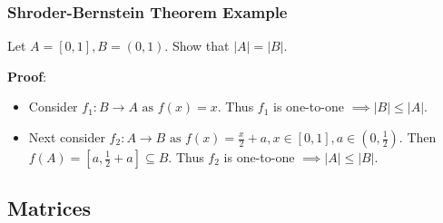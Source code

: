 \documentclass{article}
\begin{document}
\subsubsection{Shroder-Bernstein Theorem Example}

Let $ A = [0, 1], B = (0, 1) $. Show that $ |A| = |B| $.

\textbf{Proof}:
\begin{itemize}
	\item Consider $ f_1: B \rightarrow A \text{ as } f(x) = x $. Thus $ f_1 $ is one-to-one $ \implies |B| \leq |A| $.

	\item Next consider $ f_2: A \rightarrow B \text{ as } f(x) = \frac{ x }{ 2 } + a, x \in \left[ 0, 1 \right], a \in \left( 0, \frac{ 1 }{ 2 } \right) $. Then $ f(A) = \left[ a, \frac{ 1 }{ 2 } + a \right] \subseteq B $. Thus $ f_2 $ is one-to-one $ \implies |A| \leq |B| $.
\end{itemize}

\subsection{Matrices}
\end{document}

